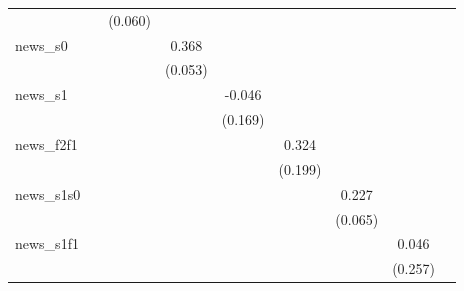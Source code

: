 {\begin{tabular}{l*{8}{c}}
            &                     &     (0.060)         &                     &                     &                     &                     &                     &                     \\
\addlinespace
news\_s0     &                     &                     &       0.368\sym{***}&                     &                     &                     &                     &                     \\
            &                     &                     &     (0.053)         &                     &                     &                     &                     &                     \\
\addlinespace
news\_s1     &                     &                     &                     &      -0.046         &                     &                     &                     &                     \\
            &                     &                     &                     &     (0.169)         &                     &                     &                     &                     \\
\addlinespace
news\_f2f1   &                     &                     &                     &                     &       0.324         &                     &                     &                     \\
            &                     &                     &                     &                     &     (0.199)         &                     &                     &                     \\
\addlinespace
news\_s1s0   &                     &                     &                     &                     &                     &       0.227\sym{***}&                     &                     \\
            &                     &                     &                     &                     &                     &     (0.065)         &                     &                     \\
\addlinespace
news\_s1f1   &                     &                     &                     &                     &                     &                     &       0.046         &                     \\
            &                     &                     &                     &                     &                     &                     &     (0.257)         &                     \\

\end{tabular}}
